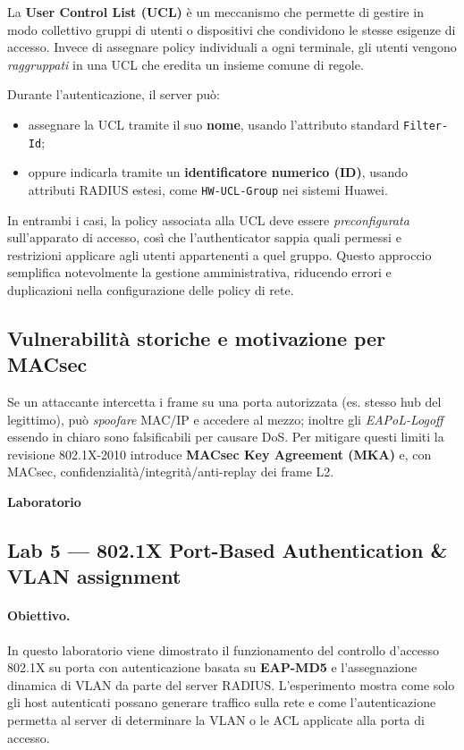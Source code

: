 La \textbf{User Control List (UCL)} è un meccanismo che permette di gestire in modo
collettivo gruppi di utenti o dispositivi che condividono le stesse esigenze di accesso.
Invece di assegnare policy individuali a ogni terminale, gli utenti vengono
\emph{raggruppati} in una UCL che eredita un insieme comune di regole.

\noindent
Durante l’autenticazione, il server può:
\begin{itemize}
  \item assegnare la UCL tramite il suo \textbf{nome}, usando l’attributo standard \texttt{Filter-Id};
  \item oppure indicarla tramite un \textbf{identificatore numerico (ID)}, usando attributi RADIUS estesi,
        come \texttt{HW-UCL-Group} nei sistemi Huawei.
\end{itemize}

\noindent
In entrambi i casi, la policy associata alla UCL deve essere \emph{preconfigurata}
sull’apparato di accesso, così che l’authenticator sappia quali permessi e restrizioni
applicare agli utenti appartenenti a quel gruppo.  
Questo approccio semplifica notevolmente la gestione amministrativa,
riducendo errori e duplicazioni nella configurazione delle policy di rete.

\subsection{Vulnerabilità storiche e motivazione per MACsec}
Se un attaccante intercetta i frame su una porta autorizzata (es. stesso hub del legittimo), può \emph{spoofare} MAC/IP e 
accedere al mezzo; inoltre gli \emph{EAPoL-Logoff} essendo in chiaro sono falsificabili per causare DoS.
 Per mitigare questi limiti la revisione 802.1X-2010 introduce \textbf{MACsec Key Agreement (MKA)} e, con MACsec, 
 confidenzialità/integrità/anti-replay dei frame L2. 



\newpage
\maketitle
{\LARGE \textbf{Laboratorio}} \\[0.5em]
\subsection{Lab 5 — 802.1X Port-Based Authentication \& VLAN assignment}

\paragraph{Obiettivo.}
In questo laboratorio viene dimostrato il funzionamento del controllo d’accesso
802.1X su porta con autenticazione basata su \textbf{EAP-MD5}
e l’assegnazione dinamica di VLAN da parte del server RADIUS.
L’esperimento mostra come solo gli host autenticati possano generare traffico
sulla rete e come l’autenticazione permetta al server di determinare la VLAN
o le ACL applicate alla porta di accesso.


